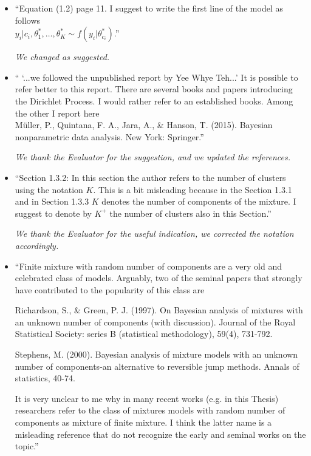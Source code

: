 \documentclass[11pt]{letter}
\begin{document}
\begin{itemize}
%
\item ``Equation (1.2) page 11.
I suggest to write the first line of the model as follows\\
$y_i|c_i,\theta^*_1,\dots,\theta^*_K \sim f(y_i|\theta^*_{c_i})$.''
\vskip1mm

{\em 
	We changed as suggested.
}
\vskip3mm

%
\item `` `...we followed the unpublished report by Yee Whye Teh...'
It is possible to refer better to this report. There are several books and papers introducing the Dirichlet Process. I would rather refer to an established books. Among the other I report here\\
M\"uller, P., Quintana, F. A., Jara, A., \& Hanson, T. (2015). Bayesian nonparametric data analysis. New York: Springer.''\vskip1mm

{\em 
	We thank the Evaluator for the suggestion, and we updated the references.
}
\vskip3mm

%
\item ``Section 1.3.2:
In this section the author refers to the number of clusters using the notation $K$. This is a bit misleading because in the Section 1.3.1 and in Section 1.3.3 $K$ denotes the number of components of the mixture. I suggest to denote by $K^+$ the number of clusters also in this Section.''\vskip1mm

{\em 
	We thank the Evaluator for the useful indication, we corrected the notation accordingly.
}
\vskip3mm

%
\item ``Finite mixture with random number of components are a very old and celebrated class of models. Arguably, two of the seminal papers that strongly have contributed to the popularity of this class are

Richardson, S., \& Green, P. J. (1997). On Bayesian analysis of mixtures with an unknown number of components (with discussion). Journal of the Royal Statistical Society: series B (statistical methodology), 59(4), 731-792.

Stephens, M. (2000). Bayesian analysis of mixture models with an unknown number of components-an
alternative to reversible jump methods. Annals of statistics, 40-74.

It is very unclear to me why in many recent works (e.g. in this Thesis) researchers refer to the class of mixtures models with random number of components as mixture of finite mixture. I think the latter name is a misleading reference that do not recognize the early and seminal works on the topic.''\vskip1mm


\end{itemize}
\end{document}
